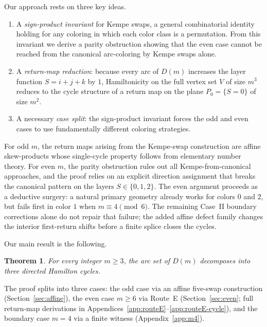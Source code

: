\documentclass[11pt]{article}
\newtheorem{theorem}{Theorem}
\begin{document}
Our approach rests on three key ideas.
\begin{enumerate}[label=\textup{(\roman*)},leftmargin=2.5em]
\item A \emph{sign-product invariant} for Kempe swaps, a general combinatorial identity holding for any coloring in which each color class is a permutation.
From this invariant we derive a parity obstruction showing that the even case cannot be reached from the canonical arc-coloring by Kempe swaps alone.
\item A \emph{return-map reduction}: because every arc of $D(m)$ increases the layer function $S=i+j+k$ by $1$, Hamiltonicity on the full vertex set $V$ of size $m^3$ reduces to the cycle structure of a return map on the plane $P_0=\{S=0\}$ of size $m^2$.
\item A necessary \emph{case split}: the sign-product invariant forces the odd and even cases to use fundamentally different coloring strategies.
\end{enumerate}
For odd $m$, the return maps arising from the Kempe-swap construction are affine skew-products whose single-cycle property follows from elementary number theory.
For even $m$, the parity obstruction rules out all Kempe-from-canonical approaches, and the proof relies on an explicit direction assignment that breaks the canonical pattern on the layers $S\in\{0,1,2\}$.
The even argument proceeds as a deductive surgery: a natural primary geometry already works for colors $0$ and $2$, but fails first in color $1$ when $m\equiv 4\pmod 6$.
The remaining Case~II boundary corrections alone do not repair that failure; the added affine defect family changes the interior first-return shifts before a finite splice closes the cycles.

Our main result is the following.

\begin{theorem}\label{thm:main-all}
For every integer $m\ge 3$, the arc set of $D(m)$ decomposes into three directed Hamilton cycles.
\end{theorem}

The proof splits into three cases: the odd case via an affine five-swap construction (Section~\ref{sec:affine}), the even case $m\ge 6$ via Route~E (Section~\ref{sec:even}; full return-map derivations in Appendices~\ref{app:routeE}--\ref{app:routeE-cycle}), and the boundary case $m=4$ via a finite witness (Appendix~\ref{app:m4}).
\end{document}
